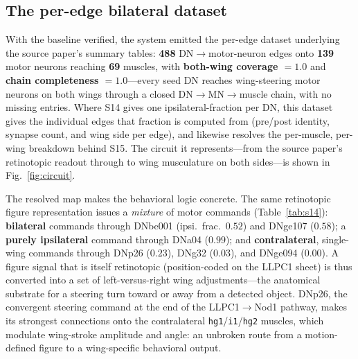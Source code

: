 \documentclass[11pt]{article}
\newcommand{\ttt}[1]{\texttt{\small #1}}
\begin{document}
\subsection{The per-edge bilateral dataset}

With the baseline verified, the system emitted the per-edge dataset underlying the source paper's
summary tables: \textbf{488} DN$\rightarrow$motor-neuron edges onto \textbf{139} motor neurons reaching
\textbf{69} muscles, with \textbf{both-wing coverage $=1.0$} and \textbf{chain completeness $=1.0$}---every
seed DN reaches wing-steering motor neurons on both wings through a closed
DN$\rightarrow$MN$\rightarrow$muscle chain, with no missing entries. Where S14 gives one
ipsilateral-fraction per DN, this dataset gives the individual edges that fraction is computed from
(pre/post identity, synapse count, and wing side per edge), and likewise resolves the per-muscle,
per-wing breakdown behind S15. The circuit it represents---from the source paper's retinotopic readout
through to wing musculature on both sides---is shown in Fig.~\ref{fig:circuit}.

The resolved map makes the behavioral logic concrete. The same retinotopic figure representation
issues a \emph{mixture} of motor commands (Table~\ref{tab:s14}): \textbf{bilateral} commands through
DNbe001 (ipsi.\ frac.\ $0.52$) and DNge107 ($0.58$); a \textbf{purely ipsilateral} command through
DNa04 ($0.99$); and \textbf{contralateral}, single-wing commands through DNp26 ($0.23$), DNg32
($0.03$), and DNge094 ($0.00$). A figure signal that is itself retinotopic (position-coded on the
LLPC1 sheet) is thus converted into a set of left-versus-right wing adjustments---the anatomical
substrate for a steering turn toward or away from a detected object. DNp26, the convergent steering
command at the end of the LLPC1$\rightarrow$Nod1 pathway, makes its strongest connections onto the
contralateral \ttt{hg1}/\ttt{i1}/\ttt{hg2} muscles, which modulate wing-stroke amplitude and angle:
an unbroken route from a motion-defined figure to a wing-specific behavioral output.
\end{document}
